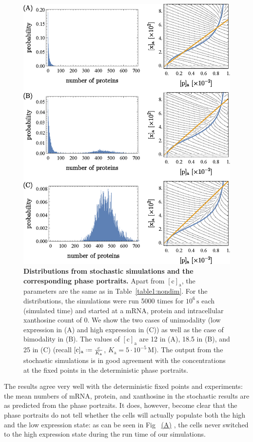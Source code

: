 \documentclass[10pt,letterpaper]{article}
\newcommand{\unit}[1]{\,\mathrm{#1}}
\newcommand{\n}[1]{\mathrm{#1}}
\newcommand*{\defeq}{\mathrel{\vcenter{\baselineskip0.5ex \lineskiplimit0pt
			\hbox{\scriptsize.}\hbox{\scriptsize.}}}%
	=}
\newcommand\subref[2]{%
	\def\myref{\getrefnumber{#1}}%
	\hyperref[#1]{\myref\mbox{#2}}%
}
\begin{document}
\begin{figure}%
	\centering
	\includegraphics[width=1\textwidth]{media/HistogramsC.eps}
	\caption{{\bf Distributions from stochastic simulations and the corresponding phase portraits.}
		Apart from $\n{[c]_a}$, the parameters are the same as in
		Table~\ref{table1:nondim}. For the distributions, the simulations
		were run 5000 times for $10^6 \unit{s}$ each (simulated time) and
		started at a mRNA, protein and intracellular xanthosine count of 0.
		We show the two cases of unimodality (low expression in (A) and high
		expression in (C)) as well as the case of bimodality in (B). The
		values of $\n{[c]_a}$ are 12 in (A), 18.5 in (B), and 25 in (C)
		(recall $\n{[c]_{a}} \defeq \frac{c}{K_{\n{a}}}$, $K_{\n{a}} = 5
		\cdot 10^{-5} \unit{M}$). The output from the stochastic simulations
		is in good agreement with the concentrations at the fixed points in
		the deterministic phase portraits.}
	\label{fig8:stochC}
\end{figure}

The results agree very well with the deterministic fixed points and
experiments: the mean numbers of mRNA, protein, and xanthosine in the
stochastic results are as predicted from the phase portraits. It does,
however, become clear that the phase portraits do not tell whether the cells
will actually populate both the high and the low expression state: as can be
seen in Fig~\subref{fig8:stochC}{(A)}, the cells never switched to the high
expression state during the run time of our simulations.
\end{document}
